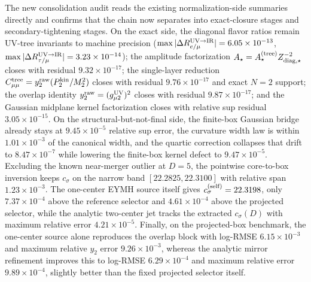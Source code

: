 \documentclass[aps,prd,onecolumn,notitlepage,nofootinbib,superscriptaddress,11pt,floatfix]{revtex4-2}
\begin{document}
The new consolidation audit  reads the existing normalization-side summaries directly and confirms that the chain now separates into exact-closure stages and secondary-tightening stages.  On the exact side, the diagonal flavor ratios remain UV-tree invariants to machine precision (\(\max|\Delta R_{e/\mu}^{\rm UV\to IR}|=6.05\times10^{-13}\), \(\max|\Delta R_{\tau/\mu}^{\rm UV\to IR}|=3.23\times10^{-14}\)); the amplitude factorization \(A_\star=A_\star^{\rm(tree)}Z_{{\rm diag},\star}^{-2}\) closes with residual \(9.32\times10^{-17}\); the single-layer reduction \(C_{\mu\mu}^{\rm tree}=y_2^{\rm raw}(P_2^{\rm kin}/M_2^2)\) closes with residual \(9.76\times10^{-17}\) and exact \(N=2\) support; the overlap identity \(y_2^{\rm raw}=(g_{\mu2}^{\rm UV})^2\) closes with residual \(9.87\times10^{-17}\); and the Gaussian midplane kernel factorization closes with relative sup residual \(3.05\times10^{-15}\).  On the structural-but-not-final side, the finite-box Gaussian bridge already stays at \(9.45\times10^{-5}\) relative sup error, the curvature width law is within \(1.01\times10^{-3}\) of the canonical width, and the quartic correction collapses that drift to \(8.47\times10^{-7}\) while lowering the finite-box kernel defect to \(9.47\times10^{-5}\).  Excluding the known near-merger outlier at \(D=5\), the pointwise core-to-box inversion keeps \(c_\sigma\) on the narrow band \([22.2825,22.3100]\) with relative span \(1.23\times10^{-3}\).  The one-center EYMH source itself gives \(c_\sigma^{\rm(self)}=22.3198\), only \(7.37\times10^{-4}\) above the reference selector and \(4.61\times10^{-4}\) above the projected selector, while the analytic two-center jet tracks the extracted \(c_\sigma(D)\) with maximum relative error \(4.21\times10^{-5}\).  Finally, on the projected-box benchmark, the one-center source alone reproduces the overlap block with log-RMSE \(6.15\times10^{-3}\) and maximum relative \(y_2\) error \(9.26\times10^{-3}\), whereas the analytic mirror refinement improves this to log-RMSE \(6.29\times10^{-4}\) and maximum relative error \(9.89\times10^{-4}\), slightly better than the fixed projected selector itself.
\end{document}
